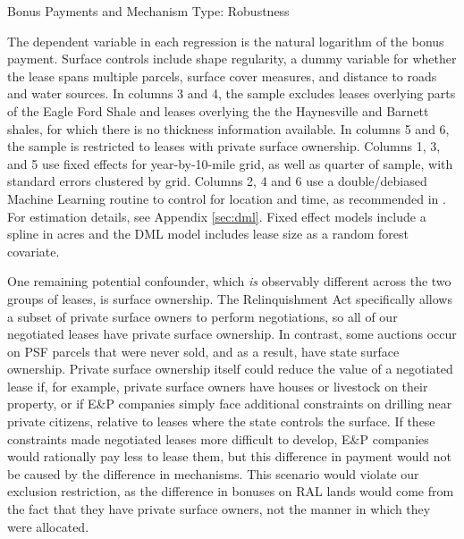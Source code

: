 \documentclass[12pt]{article}
\begin{document}
\begin{table}[!htbp]
	\begin{center}
	\begin{threeparttable}
		\caption{Bonus Payments and Mechanism Type: Robustness}
		\label{tab:BonusRobust}
		\small
		            
		\begin{tablenotes}
		\footnotesize
		\item The dependent variable in each regression is the natural logarithm of the bonus payment.  Surface controls include shape regularity, a dummy variable for whether the lease spans multiple parcels, surface cover measures, and distance to roads and water sources.  In columns 3 and 4, the sample excludes leases overlying parts of the Eagle Ford Shale and leases overlying the the Haynesville and Barnett	 shales, for which there is no thickness information available.  In columns 5 and 6, the sample is restricted to leases with private surface ownership.  Columns 1, 3, and 5  use fixed effects for year-by-10-mile grid, as well as quarter of sample, with standard errors clustered by grid.  Columns 2, 4 and 6 use a double/debiased Machine Learning routine to control for location and time, as recommended in \cite{chernozhukov2018double}.  For estimation details, see Appendix \ref{sec:dml}.  Fixed effect models include a spline in acres and the DML model includes lease size as a random forest covariate.
		\end{tablenotes}
	\end{threeparttable}
	\end{center}
\end{table}
\addtolength{\tabcolsep}{-6pt}

One remaining potential confounder, which \emph{is} observably different across the two groups of leases, is surface ownership. The Relinquishment Act specifically allows a subset of private surface owners to perform negotiations, so all of our negotiated leases have private surface ownership. In contrast, some auctions occur on PSF parcels that were never sold, and as a result, have state surface ownership.  Private surface ownership itself could reduce the value of a negotiated lease if, for example, private surface owners have houses or livestock on their property, or if E\&P companies simply face additional constraints on drilling near private citizens, relative to leases where the state controls the surface. If these constraints made negotiated leases more difficult to develop, E\&P companies would rationally pay less to lease them, but this difference in payment would not be caused by the difference in mechanisms. This scenario would violate our exclusion restriction, as the difference in bonuses on RAL lands would come from the fact that they have private surface owners, not the manner in which they were allocated.
\end{document}
